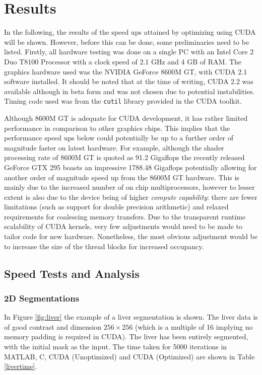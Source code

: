 \chapter{Results}

In the following, the results of the speed ups attained by optimizing using CUDA will be shown. However, before this can be done, some preliminaries need to be listed. Firstly, all hardware testing was done on a single PC with an Intel Core 2 Duo T8100 Processor with a clock speed of 2.1 GHz and 4 GB of RAM. The graphics hardware used was the NVIDIA GeForce 8600M GT, with CUDA 2.1 software installed. It should be noted that at the time of writing, CUDA 2.2 was available although in beta form and was not chosen due to potential instabilities. Timing code used was from the \texttt{cutil} library provided in the CUDA toolkit.

Although 8600M GT is adequate for CUDA development, it has rather limited performance in comparison to other graphics chips. This implies that the performance speed ups below could potentially be up to a further order of magnitude faster on latest hardware. For example, although the shader processing rate of 8600M GT is quoted as 91.2 Gigaflops the recently released GeForce GTX 295 boasts an impressive 1788.48 Gigaflops potentially allowing for another order of magnitude speed up from the 8600M GT hardware. This is mainly due to the increased number of on chip multiprocessors, however to lesser extent is also due to the device being of higher \textit{compute capability}: there are fewer limitations (such as support for double precision arithmetic) and relaxed requirements for coalescing memory transfers. Due to the transparent runtime scalability of CUDA kernels, very few adjustments would need to be made to tailor code for new hardware. Nonetheless, the most obvious adjustment would be to increase the size of the thread blocks for increased occupancy.

\section{Speed Tests and Analysis}\label{results}

\subsection{2D Segmentations}


In Figure \ref{fig:liver} the example of a liver segmentation is shown. The liver data is of good contrast and dimension $256\times 256$ (which is a multiple of 16 implying no memory padding is required in CUDA). The liver has been entirely segmented, with the initial mask as the input. The time taken for 5000 iterations in MATLAB, C, CUDA (Unoptimized) and CUDA (Optimized) are shown in Table \ref{livertime}.

